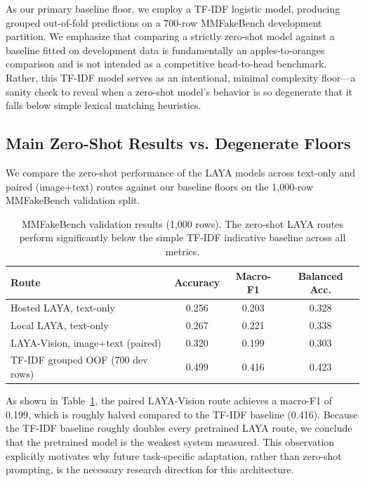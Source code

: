 \documentclass{article} %
\begin{document}
As our primary baseline floor, we employ a TF-IDF logistic model, producing grouped out-of-fold predictions on a 700-row MMFakeBench development partition. We emphasize that comparing a strictly zero-shot model against a baseline fitted on development data is fundamentally an apples-to-oranges comparison and is not intended as a competitive head-to-head benchmark. Rather, this TF-IDF model serves as an intentional, minimal complexity floor---a sanity check to reveal when a zero-shot model's behavior is so degenerate that it falls below simple lexical matching heuristics.

\subsection{Main Zero-Shot Results vs. Degenerate Floors}
We compare the zero-shot performance of the LAYA models across text-only and paired (image+text) routes against our baseline floors on the 1,000-row MMFakeBench validation split. 

\begin{table}[h]
\caption{MMFakeBench validation results (1,000 rows). The zero-shot LAYA routes perform significantly below the simple TF-IDF indicative baseline across all metrics.}
\label{tab:mmfakebench_val}
\begin{center}
\begin{tabular}{lccc}
\toprule
\textbf{Route} & \textbf{Accuracy} & \textbf{Macro-F1} & \textbf{Balanced Acc.} \\
\midrule
Hosted LAYA, text-only & 0.256 & 0.203 & 0.328 \\
Local LAYA, text-only & 0.267 & 0.221 & 0.338 \\
LAYA-Vision, image+text (paired) & 0.320 & 0.199 & 0.303 \\
TF-IDF grouped OOF (700 dev rows) & 0.499 & 0.416 & 0.423 \\
\bottomrule
\end{tabular}
\end{center}
\end{table}

As shown in Table~\ref{tab:mmfakebench_val}, the paired LAYA-Vision route achieves a macro-F1 of 0.199, which is roughly halved compared to the TF-IDF baseline (0.416). Because the TF-IDF baseline roughly doubles every pretrained LAYA route, we conclude that the pretrained model is the weakest system measured. This observation explicitly motivates why future task-specific adaptation, rather than zero-shot prompting, is the necessary research direction for this architecture. 
\end{document}
